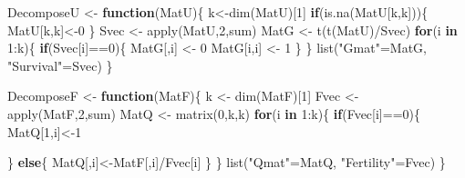 \documentclass[
]{book}
\newenvironment{Shaded}{\begin{snugshade}}{\end{snugshade}}
\newcommand{\ControlFlowTok}[1]{\textcolor[rgb]{0.13,0.29,0.53}{\textbf{#1}}}
\newcommand{\DecValTok}[1]{\textcolor[rgb]{0.00,0.00,0.81}{#1}}
\newcommand{\FunctionTok}[1]{\textcolor[rgb]{0.00,0.00,0.00}{#1}}
\newcommand{\NormalTok}[1]{#1}
\newcommand{\OtherTok}[1]{\textcolor[rgb]{0.56,0.35,0.01}{#1}}
\newcommand{\SpecialCharTok}[1]{\textcolor[rgb]{0.00,0.00,0.00}{#1}}
\newcommand{\StringTok}[1]{\textcolor[rgb]{0.31,0.60,0.02}{#1}}
\begin{document}
\begin{Shaded}
\begin{Highlighting}[]
\NormalTok{DecomposeU }\OtherTok{\textless{}{-}} \ControlFlowTok{function}\NormalTok{(MatU)\{}
\NormalTok{  k}\OtherTok{\textless{}{-}}\FunctionTok{dim}\NormalTok{(MatU)[}\DecValTok{1}\NormalTok{]}
  \ControlFlowTok{if}\NormalTok{(}\FunctionTok{is.na}\NormalTok{(MatU[k,k]))\{}
\NormalTok{    MatU[k,k]}\OtherTok{\textless{}{-}}\DecValTok{0}
\NormalTok{  \}}
\NormalTok{  Svec }\OtherTok{\textless{}{-}} \FunctionTok{apply}\NormalTok{(MatU,}\DecValTok{2}\NormalTok{,sum)}
\NormalTok{  MatG }\OtherTok{\textless{}{-}} \FunctionTok{t}\NormalTok{(}\FunctionTok{t}\NormalTok{(MatU)}\SpecialCharTok{/}\NormalTok{Svec)}
  \ControlFlowTok{for}\NormalTok{(i }\ControlFlowTok{in} \DecValTok{1}\SpecialCharTok{:}\NormalTok{k)\{}
    \ControlFlowTok{if}\NormalTok{(Svec[i]}\SpecialCharTok{==}\DecValTok{0}\NormalTok{)\{}
\NormalTok{      MatG[,i] }\OtherTok{\textless{}{-}} \DecValTok{0}
\NormalTok{      MatG[i,i] }\OtherTok{\textless{}{-}} \DecValTok{1}
\NormalTok{    \}}
\NormalTok{  \}}
 \FunctionTok{list}\NormalTok{(}\StringTok{"Gmat"}\OtherTok{=}\NormalTok{MatG, }\StringTok{"Survival"}\OtherTok{=}\NormalTok{Svec)}
\NormalTok{\}}
\end{Highlighting}
\end{Shaded}

\begin{Shaded}
\begin{Highlighting}[]
\NormalTok{DecomposeF }\OtherTok{\textless{}{-}} \ControlFlowTok{function}\NormalTok{(MatF)\{}
\NormalTok{    k }\OtherTok{\textless{}{-}} \FunctionTok{dim}\NormalTok{(MatF)[}\DecValTok{1}\NormalTok{]}
\NormalTok{    Fvec }\OtherTok{\textless{}{-}} \FunctionTok{apply}\NormalTok{(MatF,}\DecValTok{2}\NormalTok{,sum)}
\NormalTok{    MatQ }\OtherTok{\textless{}{-}} \FunctionTok{matrix}\NormalTok{(}\DecValTok{0}\NormalTok{,k,k)}
    \ControlFlowTok{for}\NormalTok{(i }\ControlFlowTok{in} \DecValTok{1}\SpecialCharTok{:}\NormalTok{k)\{}
        \ControlFlowTok{if}\NormalTok{(Fvec[i]}\SpecialCharTok{==}\DecValTok{0}\NormalTok{)\{}
\NormalTok{            MatQ[}\DecValTok{1}\NormalTok{,i]}\OtherTok{\textless{}{-}}\DecValTok{1}
            
\NormalTok{        \}}
        \ControlFlowTok{else}\NormalTok{\{}
\NormalTok{            MatQ[,i]}\OtherTok{\textless{}{-}}\NormalTok{MatF[,i]}\SpecialCharTok{/}\NormalTok{Fvec[i]}
\NormalTok{        \}}
\NormalTok{    \}}
 \FunctionTok{list}\NormalTok{(}\StringTok{"Qmat"}\OtherTok{=}\NormalTok{MatQ, }\StringTok{"Fertility"}\OtherTok{=}\NormalTok{Fvec)}
\NormalTok{\}}
\end{Highlighting}
\end{Shaded}
\end{document}
